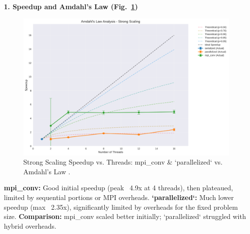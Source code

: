 \documentclass[conference, 10pt]{IEEEtran}
\begin{document}
\textbf{1. Speedup and Amdahl's Law (Fig.~\ref{fig:amdahls-law})}
\begin{figure}[H]
    \centering
    \includegraphics[width=0.7\linewidth]{figures/amdahls_law.png}
    \caption{Strong Scaling Speedup vs. Threads: mpi\_conv & `parallelized` vs. Amdahl's Law \cite{Rajput2013}.}
    \label{fig:amdahls-law}
\end{figure}
    \textbf{mpi\_conv:} Good initial speedup (peak ~4.9x at 4 threads), then plateaued, limited by sequential portions or MPI overheads.
    \textbf{`parallelized`:} Much lower speedup (max ~2.35x), significantly limited by overheads for the fixed problem size.
    \textbf{Comparison:} mpi\_conv scaled better initially; `parallelized` struggled with hybrid overheads.
\end{document}
